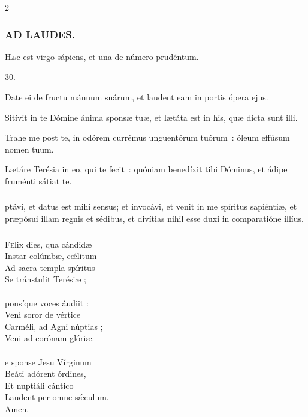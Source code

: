 \documentclass[9pt,twoside]{extarticle}
\begin{document}
\begin{multicols}{2}
{{\subsubsection*{\center \textsc{AD LAUDES.}}
\begin{center}\end{center}
\lettrine{H}æc est virgo sápiens, et una de número prudéntum.

\begin{tightlist}{}
\item {} 30.
\item {} Date ei de fructu mánuum suárum, et laudent eam in portis ópera ejus.
\item {} Sitívit in te Dómine ánima sponsæ tuæ, et lætáta est in his, quæ dicta sunt illi.
\item {} Trahe me post te, in odórem currémus unguentórum tuórum~: óleum effúsum nomen tuum.
\item {} Lætáre Terésia in eo, qui te fecit~: quóniam benedíxit tibi Dóminus, et ádipe fruménti sátiat te.
\end{tightlist}

\subsubsection*{\center {}}
ptávi, et datus est mihi sensus; et invocávi, et venit in me spíritus sapiéntiæ, et præpósui illam regnis et sédibus, et divítias nihil esse duxi in comparatióne illíus.

\subsubsection*{\center {}}
\begin{center}\end{center}
\lettrine{F}elix dies, qua cándidæ\\
Instar colúmbæ, cœ́litum\\
Ad sacra templa spíritus\\
Se tránstulit Terésiæ ;\\
\\
ponsíque voces áudiit :\\
Veni soror de vértice\\
Carméli, ad Agni núptias ;\\
Veni ad corónam glóriæ.\\
\\
e sponse Jesu Vírginum\\
Beáti adórent órdines,\\
Et nuptiáli cántico\\
Laudent per omne sǽculum.\\
Amen.

}}
\end{multicols}
\end{document}
